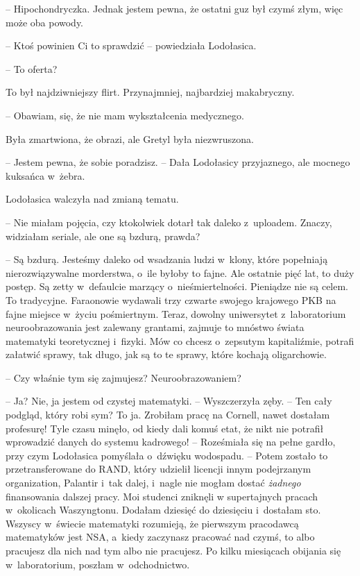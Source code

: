 \documentclass[oneside,polish,11pt,sfheadings]{mwbk}
\begin{document}
-- Hipochondryczka. Jednak jestem pewna, że ostatni guz był czymś złym,
więc może oba powody.

-- Ktoś powinien Ci to sprawdzić -- powiedziała Lodołasica.

-- To oferta?

To był najdziwniejszy flirt. Przynajmniej, najbardziej makabryczny. 

-- Obawiam, się, że nie mam wykształcenia medycznego.

Była zmartwiona, że obrazi, ale Gretyl była niezwruszona. 

-- Jestem
pewna, że sobie poradzisz. -- Dała Lodołasicy przyjaznego, ale mocnego
kuksańca w~żebra.

Lodołasica walczyła nad zmianą tematu. 

-- Nie miałam pojęcia, czy
ktokolwiek dotarł tak daleko z~uploadem. Znaczy, widziałam seriale, ale
one są bzdurą, prawda?

-- Są bzdurą. Jesteśmy daleko od wsadzania ludzi w~klony, które
popełniają nierozwiązywalne morderstwa, o~ile byłoby to fajne. Ale
ostatnie pięć lat, to duży postęp. Są zetty w~defaulcie marzący o~nieśmiertelności. Pieniądze nie są celem. To tradycyjne. Faraonowie
wydawali trzy czwarte swojego krajowego PKB na fajne miejsce w~życiu
pośmiertnym. Teraz, dowolny uniwersytet z~laboratorium neuroobrazowania
jest zalewany grantami, zajmuje to mnóstwo świata matematyki
teoretycznej i~fizyki. Mów co chcesz o~zepsutym kapitaliźmie, potrafi
załatwić sprawy, tak długo, jak są to te sprawy, które kochają
oligarchowie.

-- Czy właśnie tym się zajmujesz? Neuroobrazowaniem?

-- Ja? Nie, ja jestem od czystej matematyki. -- Wyszczerzyła zęby. -- Ten
cały podgląd, który robi sym? To ja. Zrobiłam pracę na Cornell, nawet
dostałam profesurę! Tyle czasu minęło, od kiedy dali komuś etat, że nikt
nie potrafił wprowadzić danych do systemu kadrowego! -- Roześmiała się na
pełne gardło, przy czym Lodołasica pomyślała o~dźwięku wodospadu. -- Potem zostało to przetransferowane do RAND, który udzielił licencji
innym podejrzanym organization, Palantir i~tak dalej, i~nagle nie mogłam
dostać \textit{żadnego} finansowania dalszej pracy. Moi studenci zniknęli
w supertajnych pracach w~okolicach Waszyngtonu. Dodałam dziesięć do
dziesięciu i~dostałam sto. Wszyscy w~świecie matematyki rozumieją, że
pierwszym pracodawcą matematyków jest NSA, a~kiedy zaczynasz pracować
nad czymś, to albo pracujesz dla nich nad tym albo nie pracujesz. Po
kilku miesiącach obijania się w~laboratorium, poszłam w~odchodnictwo.
\end{document}
